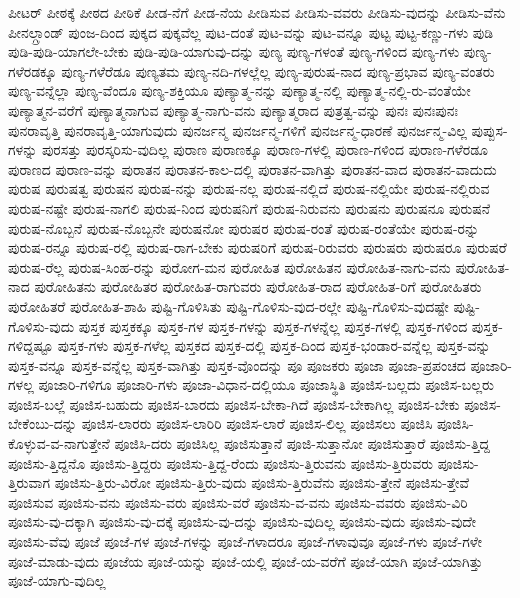 {ಪೀಟರ್
ಪೀಠಕ್ಕೆ
ಪೀಠದ
ಪೀಠಿಕೆ
ಪೀಡ-ನೆಗೆ
ಪೀಡ-ನೆಯ
ಪೀಡಿಸುವ
ಪೀಡಿಸು-ವವರು
ಪೀಡಿಸು-ವುದನ್ನು
ಪೀಡಿಸು-ವೆನು
ಪೀನಲ್ಗ್ರಾಂಡ್
ಪುಂಜ-ದಿಂದ
ಪುಕ್ಕದ
ಪುಕ್ಕವೆಲ್ಲ
ಪುಟ-ದಂತೆ
ಪುಟ-ವನ್ನು
ಪುಟ-ವನ್ನೂ
ಪುಟ್ಟ
ಪುಟ್ಟ-ಕಣ್ಣು-ಗಳು
ಪುಡಿ
ಪುಡಿ-ಪುಡಿ-ಯಾಗಲೇ-ಬೇಕು
ಪುಡಿ-ಪುಡಿ-ಯಾಗುವು-ದನ್ನು
ಪುಣ್ಯ
ಪುಣ್ಯ-ಗಳಂತೆ
ಪುಣ್ಯ-ಗಳಿಂದ
ಪುಣ್ಯ-ಗಳು
ಪುಣ್ಯ-ಗಳೆರಡಕ್ಕೂ
ಪುಣ್ಯ-ಗಳೆರೆಡೂ
ಪುಣ್ಯತಮ
ಪುಣ್ಯ-ನದಿ-ಗಳಲ್ಲೆಲ್ಲ
ಪುಣ್ಯ-ಪುರುಷ-ನಾದ
ಪುಣ್ಯ-ಪ್ರಭಾವ
ಪುಣ್ಯ-ವಂತರು
ಪುಣ್ಯ-ವನ್ನೆಲ್ಲಾ
ಪುಣ್ಯ-ವೆಂದೂ
ಪುಣ್ಯ-ಶಕ್ತಿಯೂ
ಪುಣ್ಯಾತ್ಮ-ನನ್ನು
ಪುಣ್ಯಾತ್ಮ-ನಲ್ಲಿ
ಪುಣ್ಯಾತ್ಮ-ನಲ್ಲಿ-ರು-ವಂತೆಯೇ
ಪುಣ್ಯಾತ್ಮನ-ವರೆಗೆ
ಪುಣ್ಯಾತ್ಮನಾಗುವ
ಪುಣ್ಯಾತ್ಮ-ನಾಗು-ವನು
ಪುಣ್ಯಾತ್ಮರಾದ
ಪುತ್ರತ್ವ-ವನ್ನು
ಪುನಃ
ಪುನಃಪುನಃ
ಪುನರಾವೃತ್ತಿ
ಪುನರಾವೃತ್ತಿ-ಯಾಗುವುದು
ಪುನರ್ಜನ್ಮ
ಪುನರ್ಜನ್ಮ-ಗಳಿಗೆ
ಪುನರ್ಜನ್ಮ-ಧಾರಣೆ
ಪುನರ್ಜನ್ಮ-ವಿಲ್ಲ
ಪುಪ್ಪುಸ-ಗಳನ್ನು
ಪುರಸತ್ತು
ಪುರಸ್ಕರಿಸು-ವುದಿಲ್ಲ
ಪುರಾಣ
ಪುರಾಣಕ್ಕೂ
ಪುರಾಣ-ಗಳಲ್ಲಿ
ಪುರಾಣ-ಗಳಿಂದ
ಪುರಾಣ-ಗಳೆರಡೂ
ಪುರಾಣದ
ಪುರಾಣ-ವನ್ನು
ಪುರಾತನ
ಪುರಾತನ-ಕಾಲ-ದಲ್ಲಿ
ಪುರಾತನ-ವಾಗಿತ್ತು
ಪುರಾತನ-ವಾದ
ಪುರಾತನ-ವಾದುದು
ಪುರುಷ
ಪುರುಷತ್ವ
ಪುರುಷನ
ಪುರುಷ-ನನ್ನು
ಪುರುಷ-ನಲ್ಲ
ಪುರುಷ-ನಲ್ಲಿದೆ
ಪುರುಷ-ನಲ್ಲಿಯೇ
ಪುರುಷ-ನಲ್ಲಿರುವ
ಪುರುಷ-ನಷ್ಟೇ
ಪುರುಷ-ನಾಗಲಿ
ಪುರುಷ-ನಿಂದ
ಪುರುಷನಿಗೆ
ಪುರುಷ-ನಿರುವನು
ಪುರುಷನು
ಪುರುಷನೂ
ಪುರುಷನೆ
ಪುರುಷ-ನೊಬ್ಬನೆ
ಪುರುಷ-ನೊಬ್ಬನೇ
ಪುರುಷನೋ
ಪುರುಷರ
ಪುರುಷ-ರಂತೆ
ಪುರುಷ-ರಂತೆಯೇ
ಪುರುಷ-ರನ್ನು
ಪುರುಷ-ರನ್ನೂ
ಪುರುಷ-ರಲ್ಲಿ
ಪುರುಷ-ರಾಗ-ಬೇಕು
ಪುರುಷರಿಗೆ
ಪುರುಷ-ರಿರುವರು
ಪುರುಷರು
ಪುರುಷರೂ
ಪುರುಷರೆ
ಪುರುಷ-ರೆಲ್ಲ
ಪುರುಷ-ಸಿಂಹ-ರನ್ನು
ಪುರೋಗ-ಮನ
ಪುರೋಹಿತ
ಪುರೋಹಿತನ
ಪುರೋಹಿತ-ನಾಗು-ವನು
ಪುರೋಹಿತ-ನಾದ
ಪುರೋಹಿತನು
ಪುರೋಹಿತರ
ಪುರೋಹಿತ-ರಾಗುವರು
ಪುರೋಹಿತ-ರಾದ
ಪುರೋಹಿತ-ರಿಗೆ
ಪುರೋಹಿತರು
ಪುರೋಹಿತರೆ
ಪುರೋಹಿತ-ಶಾಹಿ
ಪುಷ್ಟಿ-ಗೊಳಿಸಿತು
ಪುಷ್ಟಿ-ಗೊಳಿಸು-ವುದ-ರಲ್ಲೇ
ಪುಷ್ಟಿ-ಗೊಳಿಸು-ವುದಷ್ಟೇ
ಪುಷ್ಟಿ-ಗೊಳಿಸು-ವುದು
ಪುಸ್ತಕ
ಪುಸ್ತಕಕ್ಕೂ
ಪುಸ್ತಕ-ಗಳ
ಪುಸ್ತಕ-ಗಳನ್ನು
ಪುಸ್ತಕ-ಗಳನ್ನೆಲ್ಲ
ಪುಸ್ತಕ-ಗಳಲ್ಲಿ
ಪುಸ್ತಕ-ಗಳಿಂದ
ಪುಸ್ತಕ-ಗಳಿದ್ದಷ್ಟೂ
ಪುಸ್ತಕ-ಗಳು
ಪುಸ್ತಕ-ಗಳೆಲ್ಲ
ಪುಸ್ತಕದ
ಪುಸ್ತಕ-ದಲ್ಲಿ
ಪುಸ್ತಕ-ದಿಂದ
ಪುಸ್ತಕ-ಭಂಡಾರ-ವನ್ನೆಲ್ಲ
ಪುಸ್ತಕ-ವನ್ನು
ಪುಸ್ತಕ-ವನ್ನೂ
ಪುಸ್ತಕ-ವನ್ನೆಲ್ಲ
ಪುಸ್ತಕ-ವಾಗಿತ್ತು
ಪುಸ್ತಕ-ವೊಂದನ್ನು
ಪೂ
ಪೂಜಕರು
ಪೂಜಾ
ಪೂಜಾ-ಪ್ರಪಂಚದ
ಪೂಜಾರಿ-ಗಳಲ್ಲ
ಪೂಜಾರಿ-ಗಳಿಗೂ
ಪೂಜಾರಿ-ಗಳು
ಪೂಜಾ-ವಿಧಾನ-ದಲ್ಲಿಯೂ
ಪೂಜಾಸ್ಥಿತಿ
ಪೂಜಿಸ-ಬಲ್ಲದು
ಪೂಜಿಸ-ಬಲ್ಲರು
ಪೂಜಿಸ-ಬಲ್ಲೆ
ಪೂಜಿಸ-ಬಹುದು
ಪೂಜಿಸ-ಬಾರದು
ಪೂಜಿಸ-ಬೇಕಾ-ಗಿದೆ
ಪೂಜಿಸ-ಬೇಕಾಗಿಲ್ಲ
ಪೂಜಿಸ-ಬೇಕು
ಪೂಜಿಸ-ಬೇಕೆಂಬು-ದನ್ನು
ಪೂಜಿಸ-ಲಾರರು
ಪೂಜಿಸ-ಲಾರಿರಿ
ಪೂಜಿಸ-ಲಾರೆ
ಪೂಜಿಸ-ಲಿಲ್ಲ
ಪೂಜಿಸಲು
ಪೂಜಿಸಿ
ಪೂಜಿಸಿ-ಕೊಳ್ಳುವ-ವ-ನಾಗುತ್ತೇನೆ
ಪೂಜಿಸಿ-ದರು
ಪೂಜಿಸಿಲ್ಲ
ಪೂಜಿಸುತ್ತಾನೆ
ಪೂಜಿ-ಸುತ್ತಾನೋ
ಪೂಜಿಸುತ್ತಾರೆ
ಪೂಜಿಸು-ತ್ತಿದ್ದ
ಪೂಜಿಸು-ತ್ತಿದ್ದನೊ
ಪೂಜಿಸು-ತ್ತಿದ್ದರು
ಪೂಜಿಸು-ತ್ತಿದ್ದ-ರೆಂದು
ಪೂಜಿಸು-ತ್ತಿರುವನು
ಪೂಜಿಸು-ತ್ತಿರುವರು
ಪೂಜಿಸು-ತ್ತಿರುವಾಗ
ಪೂಜಿಸು-ತ್ತಿರು-ವಿರೋ
ಪೂಜಿಸು-ತ್ತಿರು-ವುದು
ಪೂಜಿಸು-ತ್ತಿರುವೆನು
ಪೂಜಿಸು-ತ್ತೇನೆ
ಪೂಜಿಸು-ತ್ತೇವೆ
ಪೂಜಿಸುವ
ಪೂಜಿಸು-ವನು
ಪೂಜಿಸು-ವರು
ಪೂಜಿಸು-ವರೆ
ಪೂಜಿಸು-ವ-ವನು
ಪೂಜಿಸು-ವವರು
ಪೂಜಿಸು-ವಿರಿ
ಪೂಜಿಸು-ವು-ದಕ್ಕಾಗಿ
ಪೂಜಿಸು-ವು-ದಕ್ಕೆ
ಪೂಜಿಸು-ವು-ದನ್ನು
ಪೂಜಿಸು-ವುದಿಲ್ಲ
ಪೂಜಿಸು-ವುದು
ಪೂಜಿಸು-ವುದೇ
ಪೂಜಿಸು-ವೆವು
ಪೂಜೆ
ಪೂಜೆ-ಗಳ
ಪೂಜೆ-ಗಳನ್ನು
ಪೂಜೆ-ಗಳಾದರೂ
ಪೂಜೆ-ಗಳಾವುವೂ
ಪೂಜೆ-ಗಳು
ಪೂಜೆ-ಗಳೇ
ಪೂಜೆ-ಮಾಡು-ವುದು
ಪೂಜೆಯ
ಪೂಜೆ-ಯನ್ನು
ಪೂಜೆ-ಯಲ್ಲಿ
ಪೂಜೆ-ಯ-ವರೆಗೆ
ಪೂಜೆ-ಯಾಗಿ
ಪೂಜೆ-ಯಾಗಿತ್ತು
ಪೂಜೆ-ಯಾಗು-ವುದಿಲ್ಲ
}
